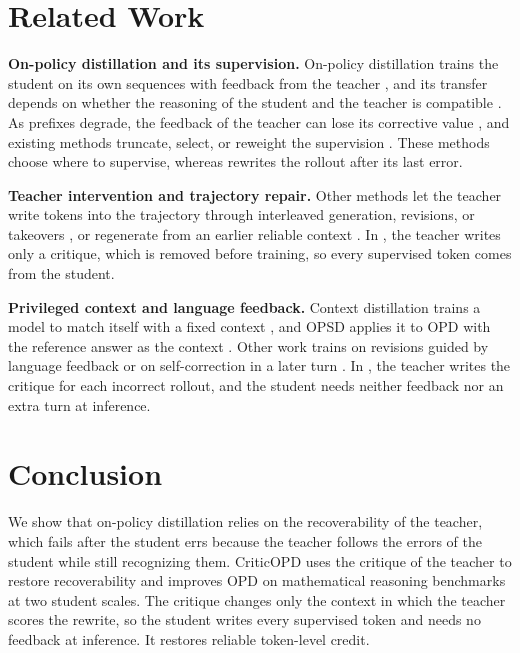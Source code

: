 \section{Related Work}
\label{sec:related}

\noindent\textbf{On-policy distillation and its supervision.}
On-policy distillation trains the student on its own sequences with feedback from the teacher \citep{agarwal2024onpolicy,gu2023minillm,ko2024distillm,yang2026eos}, and its transfer depends on whether the reasoning of the student and the teacher is compatible \citep{li2026rethinking}.
As prefixes degrade, the feedback of the teacher can lose its corrective value \citep{liu2026prefix,xin2026escaping}, and existing methods truncate, select, or reweight the supervision \citep{zhang2026fast,yang2026pruneopd,wang2026teachability,zheng2026scope,lee2026sead}.
These methods choose where to supervise, whereas \ours{} rewrites the rollout after its last error.

\noindent\textbf{Teacher intervention and trajectory repair.}
Other methods let the teacher write tokens into the trajectory through interleaved generation, revisions, or takeovers \citep{xu2025speculative,jiang2026trajectory,xu2026relay}, or regenerate from an earlier reliable context \citep{wang2026backtracking}.
In \ours{}, the teacher writes only a critique, which is removed before training, so every supervised token comes from the student.

\noindent\textbf{Privileged context and language feedback.}
Context distillation trains a model to match itself with a fixed context \citep{askell2021general,snell2022learning}, and OPSD applies it to OPD with the reference answer as the context \citep{zhao2026selfdistilled,yang2026ogls}.
Other work trains on revisions guided by language feedback \citep{scheurer2023training,zhang2026critiquegrpo} or on self-correction in a later turn \citep{kumar2025training,qu2024recursive}.
In \ours{}, the teacher writes the critique for each incorrect rollout, and the student needs neither feedback nor an extra turn at inference.

\section{Conclusion}
\label{sec:conclusion}

We show that on-policy distillation relies on the recoverability of the teacher, which fails after the student errs because the teacher follows the errors of the student while still recognizing them. CriticOPD uses the critique of the teacher to restore recoverability and improves OPD on mathematical reasoning benchmarks at two student scales. The critique changes only the context in which the teacher scores the rewrite, so the student writes every supervised token and needs no feedback at inference. It restores reliable token-level credit.